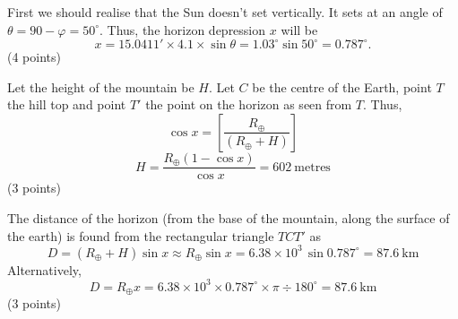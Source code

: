 First we should realise that the Sun doesn't set vertically. It sets at an
angle of $\theta = 90 - \varphi = 50^\circ$. Thus, the horizon depression
$x$ will be
\[ x = 15.0411' \times 4.1 \times \sin\theta
   = 1.03^\circ \sin 50^\circ = 0.787^\circ. \]
\hfill(4 points)

Let the height of the mountain be $H$. Let $C$ be the centre of the Earth,
point $T$ the hill top and point $T'$ the point on the horizon as seen from
$T$. Thus,
\[ \cos x = \left[\frac{R_\oplus}{(R_\oplus + H)}\right] \]
\[ H = \frac{R_\oplus(1 - \cos x)}{\cos x} = 602\ \mathrm{metres} \]
\hfill(3 points)

The distance of the horizon (from the base of the mountain, along the
surface of the earth) is found from the rectangular triangle $TCT'$ as
\[ D = (R_\oplus + H)\sin x \approx R_\oplus\sin x
   = 6.38\times 10^{3}\,\sin 0.787^\circ = 87.6\ \mathrm{km} \]
Alternatively,
\[ D = R_\oplus x = 6.38\times 10^{3}\times 0.787^\circ\times\pi
   \div 180^\circ = 87.6\ \mathrm{km} \]
\hfill(3 points)
